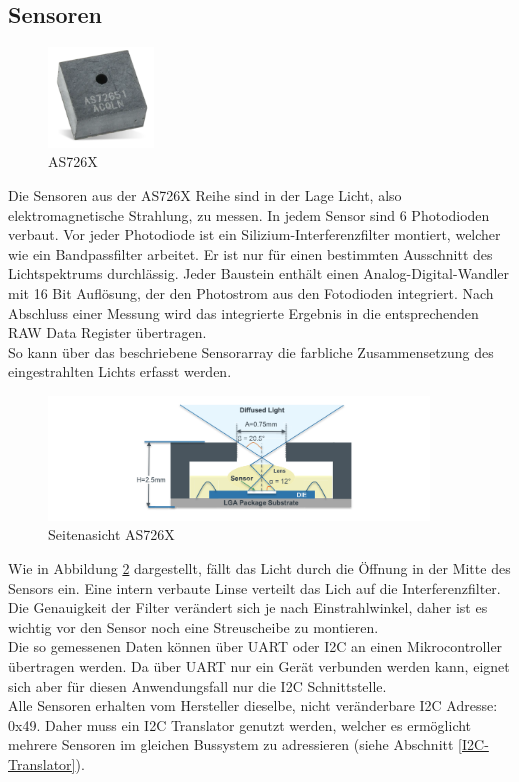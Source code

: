 \subsection{Sensoren}\label{Sensoren}

\begin{figure}
\centering
\includegraphics[width=0.25\textwidth]{img/as726X.png}
 \caption{AS726X \cite{Datenblatt_AS7265X}}
\label{fig:AS726X}
\end{figure}

Die Sensoren aus der AS726X Reihe sind in der Lage Licht, also elektromagnetische Strahlung, zu messen. 
In jedem Sensor sind 6 Photodioden verbaut. 
Vor jeder Photodiode ist ein Silizium-Interferenzfilter montiert, welcher wie ein Bandpassfilter arbeitet. Er ist nur für einen bestimmten Ausschnitt des Lichtspektrums durchlässig.
Jeder Baustein enthält einen Analog-Digital-Wandler mit 16 Bit Auflösung, der den Photostrom aus den Fotodioden integriert. Nach Abschluss einer Messung wird das integrierte Ergebnis in die entsprechenden RAW Data Register übertragen.\\
So kann über das beschriebene Sensorarray die farbliche Zusammensetzung des eingestrahlten Lichts erfasst werden.

\begin{figure}[H]
\centering
\includegraphics[width=0.9\textwidth]{img/AS726X-seitenansicht.png}
\caption{Seitenasicht AS726X\cite{Datenblatt_AS7265X}}
\label{fig:Seitenasicht-AS726X}
\end{figure}

\noindent Wie in Abbildung \ref{fig:Seitenasicht-AS726X} dargestellt, fällt das Licht durch die Öffnung in der Mitte des Sensors ein. Eine intern verbaute Linse verteilt das Lich auf die Interferenzfilter. Die Genauigkeit der Filter verändert sich je nach Einstrahlwinkel, daher ist es wichtig vor den Sensor noch eine Streuscheibe zu montieren.\\
Die so gemessenen Daten können über UART oder I2C an einen Mikrocontroller übertragen werden. Da über UART nur ein Gerät verbunden werden kann, eignet sich aber für diesen Anwendungsfall nur die I2C Schnittstelle.\\
Alle Sensoren erhalten vom Hersteller dieselbe, nicht veränderbare I2C Adresse: 0x49. Daher muss ein I2C Translator genutzt werden, welcher es ermöglicht mehrere Sensoren im gleichen Bussystem zu adressieren (siehe Abschnitt \ref{I2C-Translator}).\\


